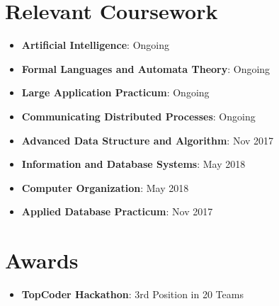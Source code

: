 \documentclass[letterpaper,11pt]{article}
\newcommand{\resumeItem}[2]{
  \item\small{
    \textbf{#1}{: #2 \vspace{-2pt}}
  }
}
\newcommand{\resumeSubItem}[2]{\resumeItem{#1}{#2}\vspace{-4pt}}
\newcommand{\resumeSubHeadingListStart}{\begin{itemize}[leftmargin=*]}
\newcommand{\resumeSubHeadingListEnd}{\end{itemize}}
\begin{document}
  
\section{Relevant Coursework}
  \resumeSubHeadingListStart
  \resumeSubItem
      {Artificial Intelligence}{Ongoing}
    \resumeSubItem
    {Formal Languages and Automata Theory}{Ongoing}
    \resumeSubItem
    {Large Application Practicum}{Ongoing}
    \resumeSubItem
    {Communicating Distributed Processes}{Ongoing}
    \resumeSubItem
    {Advanced Data Structure and Algorithm}{Nov 2017}
    \resumeSubItem
    {Information and Database Systems}{May 2018}
    \resumeSubItem
    {Computer Organization}{May 2018}
    \resumeSubItem
    {Applied Database Practicum}{Nov 2017}
          

  \resumeSubHeadingListEnd

\section{Awards}
  \resumeSubHeadingListStart

    \resumeSubItem
    {TopCoder Hackathon}{3rd Position in 20 Teams}

 \resumeSubHeadingListEnd

\end{document}
